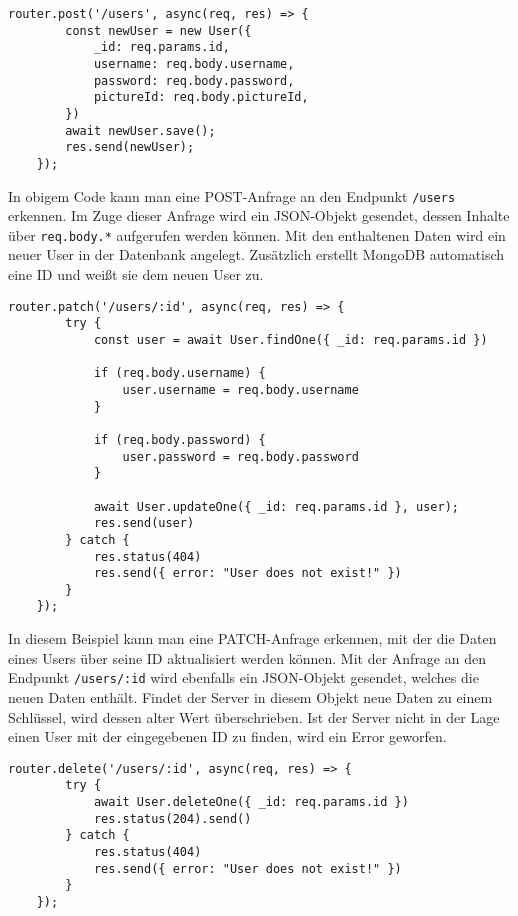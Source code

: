 \begin{lstlisting}[caption=POST-Request, label=lst:postrequest,float=!htb]
    router.post('/users', async(req, res) => {
        const newUser = new User({
            _id: req.params.id,
            username: req.body.username,
            password: req.body.password,
            pictureId: req.body.pictureId,
        })
        await newUser.save();
        res.send(newUser);
    });
\end{lstlisting}

In obigem Code kann man eine POST-Anfrage an den Endpunkt \texttt{/users} erkennen. Im Zuge dieser Anfrage wird ein JSON-Objekt gesendet, dessen Inhalte über \texttt{req.body.*} aufgerufen werden können. Mit den enthaltenen Daten wird ein neuer User in der Datenbank angelegt. Zusätzlich erstellt MongoDB automatisch eine ID und weißt sie dem neuen User zu.

\begin{lstlisting}[caption=PATCH-Request, label=lst:patchrequest,float=!htb]
    router.patch('/users/:id', async(req, res) => {
        try {
            const user = await User.findOne({ _id: req.params.id })

            if (req.body.username) {
                user.username = req.body.username
            }

            if (req.body.password) {
                user.password = req.body.password
            }

            await User.updateOne({ _id: req.params.id }, user);
            res.send(user)
        } catch {
            res.status(404)
            res.send({ error: "User does not exist!" })
        }
    });
\end{lstlisting}

In diesem Beispiel kann man eine PATCH-Anfrage erkennen, mit der die Daten eines Users über seine ID aktualisiert werden können. Mit der Anfrage an den Endpunkt \texttt{/users/:id} wird ebenfalls ein JSON-Objekt gesendet, welches die neuen Daten enthält. Findet der Server in diesem Objekt neue Daten zu einem Schlüssel, wird dessen alter Wert überschrieben. Ist der Server nicht in der Lage einen User mit der eingegebenen ID zu finden, wird ein Error geworfen.

\begin{lstlisting}[caption=DELETE-Request, label=lst:deleterequest,float=!htb]
    router.delete('/users/:id', async(req, res) => {
        try {
            await User.deleteOne({ _id: req.params.id })
            res.status(204).send()
        } catch {
            res.status(404)
            res.send({ error: "User does not exist!" })
        }
    });
\end{lstlisting}

